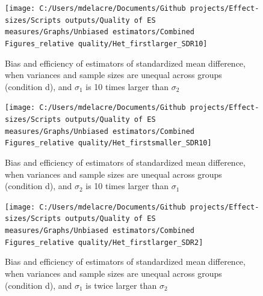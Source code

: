 \documentclass[
  english,
  man,floatsintext]{apa6}
\begin{document}
\begin{landscape}
\newpage

\begin{figure}

{\centering \texttt{[image: C:/Users/mdelacre/Documents/Github projects/Effect-sizes/Scripts outputs/Quality of ES measures/Graphs/Unbiased estimators/Combined Figures\_relative quality/Het\_firstlarger\_SDR10]} 

}

\caption{Bias and efficiency of estimators of standardized mean difference, when variances and sample sizes are unequal across groups (condition d), and $\sigma_1$ is 10 times larger than $\sigma_2$}\label{fig:idHetunbal1}
\end{figure}

\end{landscape}
\newpage
\begin{landscape}

\begin{figure}

{\centering \texttt{[image: C:/Users/mdelacre/Documents/Github projects/Effect-sizes/Scripts outputs/Quality of ES measures/Graphs/Unbiased estimators/Combined Figures\_relative quality/Het\_firstsmaller\_SDR10]} 

}

\caption{Bias and efficiency of estimators of standardized mean difference, when variances and sample sizes are unequal across groups (condition d), and $\sigma_2$ is 10 times larger than $\sigma_1$}\label{fig:idHetunbal2}
\end{figure}

\end{landscape}
\newpage
\begin{landscape}

\begin{figure}

{\centering \texttt{[image: C:/Users/mdelacre/Documents/Github projects/Effect-sizes/Scripts outputs/Quality of ES measures/Graphs/Unbiased estimators/Combined Figures\_relative quality/Het\_firstlarger\_SDR2]} 

}

\caption{Bias and efficiency of estimators of standardized mean difference, when variances and sample sizes are unequal across groups (condition d), and $\sigma_1$ is twice larger than $\sigma_2$}\label{fig:idHetunbal3}
\end{figure}

\end{landscape}
\end{document}
